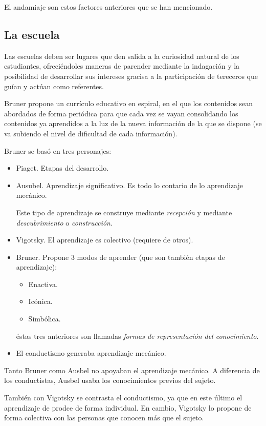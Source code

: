 \documentclass[12pt]{report}
\theoremstyle{largebreak}
\begin{document}
    El andamiaje son estos factores anteriores que se han mencionado.

    \subsection{La escuela}

    Las escuelas deben ser lugares que den salida a la curiosidad natural de los estudiantes, ofreciéndoles maneras de parender mediante la indagación y la posibilidad de desarrollar sus intereses gracisa a la participación de tereceros que guían y actúan como referentes.

    Bruner propone un currículo educativo en espiral, en el que los contenidos sean abordados de forma periódica para que cada vez se vayan consolidando los contenidos ya aprendidos a la luz de la nueva información de la que se dispone (se va subiendo el nivel de dificultad de cada información).

    Bruner se basó en tres personajes:

    \begin{itemize}
        \item Piaget. Etapas del desarrollo.
        \item Ausubel. Aprendizaje significativo. Es todo lo contario de lo aprendizaje mecánico.
        
        Este tipo de aprendizaje se construye mediante \textit{recepción} y mediante \textit{descubrimiento} o \textit{construcción}.
        \item Vigotsky. El aprendizaje es colectivo (requiere de otros).
        \item Bruner. Propone 3 modos de aprender (que son también etapas de aprendizaje):
        \begin{itemize}
            \item Enactiva.
            \item Icónica.
            \item Simbólica.
        \end{itemize}
        éstas tres anteriores son llamadas \textit{formas de representación del conocimiento}.
        \item El conductismo generaba aprendizaje mecánico.
    \end{itemize}

    Tanto Bruner como Ausbel no apoyaban el aprendizaje mecánico. A diferencia de los conductistas, Ausbel usaba los conocimientos previos del sujeto.

    También con Vigotsky se contrasta el conductismo, ya que en este último el aprendizaje de prodce de forma individual. En cambio, Vigotsky lo propone de forma colectiva con las personas que conocen más que el sujeto.
\end{document}
